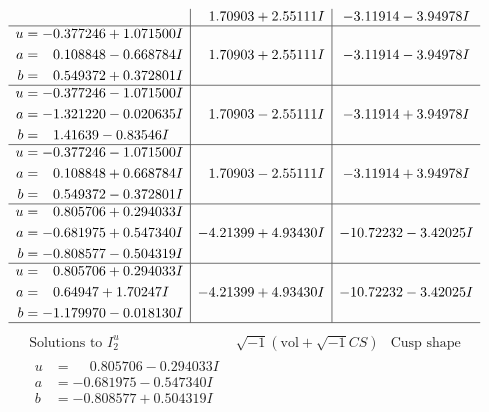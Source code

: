 \documentclass[1p]{elsarticle_modified}
\theoremstyle{definition}
\newcommand{\I}{\sqrt{-1}}
\begin{document}
$$\begin{array}{c|c|c}
 & \phantom{-}1.70903 + 2.55111 I & -3.11914 - 3.94978 I \\ \hline\begin{aligned}
u &= -0.377246 + 1.071500 I \\
a &= \phantom{-}0.108848 - 0.668784 I \\
b &= \phantom{-}0.549372 + 0.372801 I\end{aligned}
 & \phantom{-}1.70903 + 2.55111 I & -3.11914 - 3.94978 I \\ \hline\begin{aligned}
u &= -0.377246 - 1.071500 I \\
a &= -1.321220 - 0.020635 I \\
b &= \phantom{-}1.41639 - 0.83546 I\end{aligned}
 & \phantom{-}1.70903 - 2.55111 I & -3.11914 + 3.94978 I \\ \hline\begin{aligned}
u &= -0.377246 - 1.071500 I \\
a &= \phantom{-}0.108848 + 0.668784 I \\
b &= \phantom{-}0.549372 - 0.372801 I\end{aligned}
 & \phantom{-}1.70903 - 2.55111 I & -3.11914 + 3.94978 I \\ \hline\begin{aligned}
u &= \phantom{-}0.805706 + 0.294033 I \\
a &= -0.681975 + 0.547340 I \\
b &= -0.808577 - 0.504319 I\end{aligned}
 & -4.21399 + 4.93430 I & -10.72232 - 3.42025 I \\ \hline\begin{aligned}
u &= \phantom{-}0.805706 + 0.294033 I \\
a &= \phantom{-}0.64947 + 1.70247 I \\
b &= -1.179970 - 0.018130 I\end{aligned}
 & -4.21399 + 4.93430 I & -10.72232 - 3.42025 I\\
 \hline 
 \end{array}$$\newpage$$\begin{array}{c|c|c}  
\text{Solutions to }I^u_{2}& \I (\text{vol} + \sqrt{-1}CS) & \text{Cusp shape}\\
 \hline 
\begin{aligned}
u &= \phantom{-}0.805706 - 0.294033 I \\
a &= -0.681975 - 0.547340 I \\
b &= -0.808577 + 0.504319 I\end{aligned}

\end{array}$$
\end{document}
